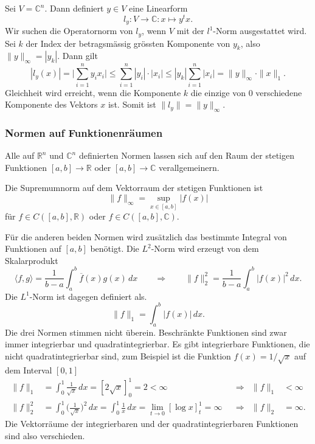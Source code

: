 \begin{beispiel}
Sei $V=\mathbb{C}^n$. 
Dann definiert $y\in V$ eine Linearform
\[
l_y
\colon
V\to \mathbb C
:
x\mapsto y^tx.
\]
Wir suchen  die Operatornorm von $l_y$, wenn $V$ mit der $l^1$-Norm
ausgestattet wird.
Sei $k$ der Index der betragsmässig grössten Komponente von $y_k$,
also $\| y\|_\infty = |y_k|$.
Dann gilt
\[
|l_y(x)|
=
\biggl|\sum_{i=1}^n y_ix_i\biggr|
\le
\sum_{i=1}^n |y_i|\cdot |x_i|
\le
|y_k| \sum_{i=1}^n |x_i|
=
\|y\|_\infty\cdot \|x\|_1.
\]
Gleichheit wird erreicht, wenn die Komponente $k$ die einzige
von $0$ verschiedene Komponente des Vektors $x$ ist.
Somit ist $\|l_y\| = \|y\|_\infty$.
\end{beispiel}


\subsubsection{Normen auf Funktionenräumen}
Alle auf $\mathbb{R}^n$ und $\mathbb{C}^n$ definierten Normen lassen
sich auf den Raum der stetigen Funktionen $[a,b]\to\mathbb{R}$ oder
$[a,b]\to\mathbb{C}$ verallgemeinern.

Die Supremumnorm auf dem Vektorraum der stetigen Funktionen ist
%
\[
\|f\|_\infty = \sup_{x\in[a,b]} |f(x)|
\]
für $f\in C([a,b],\mathbb{R})$ oder $f\in C([a,b],\mathbb{C})$.

Für die anderen beiden Normen wird zusätzlich das bestimmte Integral
von Funktionen auf $[a,b]$ benötigt.
Die $L^2$-Norm wird erzeugt von dem Skalarprodukt
%
%
\[
\langle f,g\rangle
=
\frac{1}{b-a}
\int_a^b \overline{f}(x)g(x)\,dx
\qquad\Rightarrow\qquad
\|f\|_2^2 = \frac{1}{b-a}\int_a^b |f(x)|^2\,dx.
\]
Die $L^1$-Norm ist dagegen definiert als.
\[
\|f\|_1
=
\int_a^b |f(x)|\,dx.
\]
Die drei Normen stimmen nicht überein.
Beschränkte Funktionen sind zwar immer integrierbar und quadratintegrierbar.
Es gibt integrierbare Funktionen, die nicht quadratintegrierbar sind, zum
Beispiel ist die Funktion $f(x)=1/\sqrt{x}$ auf dem Interval $[0,1]$
\begin{align*}
\|f\|_1
&=
\int_0^1 \frac 1{\sqrt{x}}\,dx
=
[2\sqrt{x}]_0^1
=
2
<
\infty
&&\Rightarrow& \|f\|_1&<\infty
\\
\|f\|_2^2
&=
\int_0^1 \biggl(\frac1{\sqrt{x}}\biggr)^2\,dx
=
\int_0^1 \frac1x\,dx
=
\lim_{t\to 0} [\log x]_t^1 = \infty
&&\Rightarrow&
\|f\|_2 &= \infty.
\end{align*}
Die Vektorräume der integrierbaren und der quadratintegrierbaren Funktionen
sind also verschieden.

